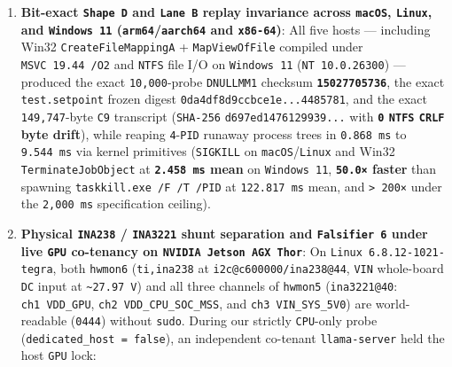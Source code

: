 \documentclass[10pt,letterpaper]{article}
\providecommand{\tightlist}{\setlength{\itemsep}{1pt}\setlength{\parskip}{0pt}}
\begin{document}
\begin{enumerate}
\def\labelenumi{\arabic{enumi}.}
\tightlist
\item
  \textbf{Bit-exact \texttt{Shape\ D} and \texttt{Lane\ B} replay
  invariance across \texttt{macOS}, \texttt{Linux}, and
  \texttt{Windows\ 11} (\texttt{arm64}/\allowbreak{}\texttt{aarch64} and
  \texttt{x86-64})}: All five hosts --- including Win32
  \texttt{CreateFileMappingA} + \texttt{MapViewOfFile} compiled under
  \texttt{MSVC\ 19.\allowbreak{}44\ /\allowbreak{}O2} and \texttt{NTFS} file I/O on
  \texttt{Windows\ 11} (\texttt{NT\ 10.\allowbreak{}0.\allowbreak{}26300}) --- produced the exact
  \texttt{10,000}-probe \texttt{DNULLMM1} checksum
  \textbf{\texttt{15027705736}}, the exact \texttt{test.\allowbreak{}setpoint} frozen
  digest \texttt{0da4df8d\allowbreak{}9ccbce1e.\allowbreak{}.\allowbreak{}.\allowbreak{}4485781}, and the exact
  \texttt{149,747}-byte \texttt{C9} transcript (\texttt{SHA-256}
  \texttt{d697ed14\allowbreak{}76129939.\allowbreak{}.\allowbreak{}.\allowbreak{}} with \textbf{\texttt{0} \texttt{NTFS}
  \texttt{CRLF} byte drift}), while reaping \texttt{4}-\texttt{PID}
  runaway process trees in \texttt{0.868\ ms} to \texttt{9.544\ ms} via
  kernel primitives (\texttt{SIGKILL} on \texttt{macOS}/\allowbreak{}\texttt{Linux}
  and Win32 \texttt{TerminateJobObject} at \textbf{\texttt{2.458\ ms}
  mean} on \texttt{Windows\ 11}, \textbf{\texttt{50.0×} faster} than
  spawning \texttt{taskkill.\allowbreak{}exe\ /\allowbreak{}F\ /\allowbreak{}T\ /\allowbreak{}PID} at \texttt{122.\allowbreak{}817\ ms}
  mean, and \texttt{\textgreater{}\ 200×} under the \texttt{2,000\ ms}
  specification ceiling).
\item
  \textbf{Physical \texttt{INA238} / \texttt{INA3221} shunt separation
  and \texttt{Falsifier\ 6} under live \texttt{GPU} co-tenancy on
  \texttt{NVIDIA\ Jetson\ AGX\ Thor}}: On
  \texttt{Linux\ 6.\allowbreak{}8.\allowbreak{}12-\allowbreak{}1021-\allowbreak{}tegra}, both \texttt{hwmon6}
  (\texttt{ti,ina238} at \texttt{i2c@c600000/\allowbreak{}ina238@44}, \texttt{VIN}
  whole-board \texttt{DC} input at \texttt{\textasciitilde{}27.97\ V})
  and all three channels of \texttt{hwmon5} (\texttt{ina3221@40}:
  \texttt{ch1\ VDD\_\allowbreak{}GPU}, \texttt{ch2\ VDD\_\allowbreak{}CPU\_\allowbreak{}SOC\_\allowbreak{}MSS}, and
  \texttt{ch3\ VIN\_\allowbreak{}SYS\_\allowbreak{}5V0}) are world-readable (\texttt{0444})
  without \texttt{sudo}. During our strictly \texttt{CPU}-only probe
  (\texttt{dedicated\_\allowbreak{}host\ =\ false}), an independent co-tenant
  \texttt{llama-\allowbreak{}server} held the host \texttt{GPU} lock:
\end{enumerate}
\end{document}
